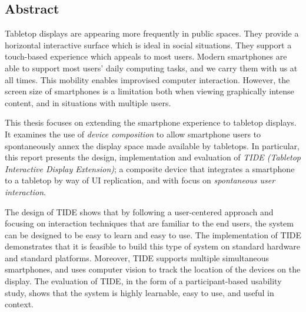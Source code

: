 \documentclass[a4paper,11pt,twoside,onecolumn,openright]{memoir}
\begin{document}



\subsection*{Abstract}

Tabletop displays are appearing more frequently in public spaces.
They provide a horizontal interactive surface which is ideal in social situations. They support a touch-based experience which appeals to most users.
Modern smartphones are able to support most users' daily computing tasks, and we carry them with us at all times.
This mobility enables improvised computer interaction.
However, the screen size of smartphones is a limitation both when viewing graphically intense content, and in situations with multiple users.

This thesis focuses on extending the smartphone experience to tabletop displays.
It examines the use of \emph{device composition} to allow smartphone users to spontaneously annex the display space made available by tabletops.
In particular, this report presents the design, implementation and evaluation of \emph{TIDE (Tabletop Interactive Display Extension)}; a composite device that integrates a smartphone to a tabletop by way of UI replication, and with focus on \emph{spontaneous user interaction}.

The design of TIDE shows that by following a user-centered approach and focusing on interaction techniques that are familiar to the end users, the system can be designed to be easy to learn and easy to use.
The implementation of TIDE demonstrates that it is feasible to build this type of system on standard hardware and standard platforms.
Moreover, TIDE supports multiple simultaneous smartphones, and uses computer vision to track the location of the devices on the display.
The evaluation of TIDE, in the form of a participant-based usability study, shows that the system is highly learnable, easy to use, and useful in context.

\clearpage

\newpage
\mbox{}
\clearpage

\hfill\\
\hfill\\
\hfill\\
\hfill\\
\hfill\\
\hfill\\
\hfill\\
\hfill\\
\hfill\\
\hfill\\
\end{document}
